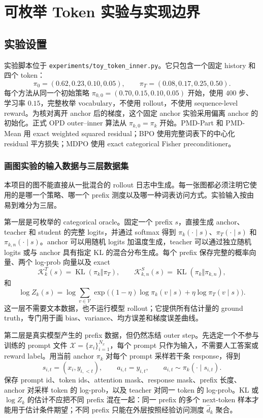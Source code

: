 \chapter{可枚举 Token 实验与实现边界}

\section{实验设置}

实验脚本位于 \texttt{experiments/toy\_token\_inner.py}。它只包含一个固定 history 和四个 token：
\[
 \pi_0=(0.62,0.23,0.10,0.05),
 \qquad
 \pi_T=(0.08,0.17,0.25,0.50).
\]
每个方法从同一个初始策略 $\pi_{0,0}=(0.70,0.15,0.10,0.05)$ 开始，使用 $400$ 步、学习率 $0.15$，完整枚举 vocabulary，不使用 rollout，不使用 sequence-level reward。为核对离开 anchor 后的梯度，这个固定 anchor 实验采用偏离 anchor 的初始化。正式 OPD outer--inner 算法从 $\pi_{k,0}=\pi_k$ 开始。PMD-Part 和 PMD-Mean 用 exact weighted squared residual；BPO 使用完整词表下的中心化 residual 平方损失；MDPO 使用 exact categorical Fisher preconditioner。

\subsection{画图实验的输入数据与三层数据集}

本项目的图不能直接从一批混合的 rollout 日志中生成。每一张图都必须注明它使用的是哪一个策略、哪一个 prefix 测度以及哪一种词表访问方式。实验输入按由易到难分为三层。

第一层是可枚举的 categorical oracle。固定一个 prefix $s$，直接生成 anchor、teacher 和 student 的完整 logits，并通过 softmax 得到 $\pi_k(\cdot\mid s)$、$\pi_T(\cdot\mid s)$ 和 $\pi_{k,n}(\cdot\mid s)$。anchor 可以用随机 logits 加温度生成，teacher 可以通过独立随机 logits 或与 anchor 具有指定 KL 的混合分布生成。每个 prefix 保存完整的概率向量、两个 log-prob 向量以及 exact
\[
\mathcal K_k^T(s)=\operatorname{KL}(\pi_k\Vert\pi_T),\qquad \mathcal K_{k,n}^S(s)=\operatorname{KL}(\pi_k\Vert\pi_{k,n}),
\]
和
\[
\log Z_k(s)=\log\sum_{v\in\mathcal V}\exp\bigl((1-\eta)\log\pi_k(v\mid s)+\eta\log\pi_T(v\mid s)\bigr).
\]
这一层不需要文本数据，也不运行模型 rollout；它提供所有估计量的 ground truth，专门用于画 bias、variance、均方误差和梯度误差曲线。

第二层是真实模型产生的 prefix 数据，但仍然冻结 outer step。先选定一个不参与训练的 prompt 文件 $\mathcal X=\{x_i\}_{i=1}^{N_x}$，每个 prompt 只作为输入，不需要人工答案或 reward label。用当前 anchor $\pi_k$ 对每个 prompt 采样若干条 response，得到
\[
s_{i,t}=(x_i,y_{i,<t}),\qquad a_{i,t}=y_{i,t},\qquad a_{i,t}\sim\pi_k(\cdot\mid s_{i,t}).
\]
保存 prompt id、token ids、attention mask、response mask、prefix 长度、anchor 对采样 token 的 log-prob，以及 teacher 对同一 token 的 log-prob。KL 或 $\log Z_k$ 的估计不应把不同 prefix 混在一起：同一 prefix 的多个 next-token 样本才能用于估计条件期望；不同 prefix 只能在外层按照经验访问测度 $\widehat d_k$ 聚合。

